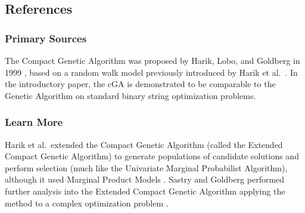

\subsection{References}

% 
% 
\subsubsection{Primary Sources}
The Compact Genetic Algorithm was proposed by Harik, Lobo, and Goldberg in 1999 \cite{Harik1999}, based on a random walk model previously introduced by Harik et al.\ \cite{Harik1997}. In the introductory paper, the cGA is demonstrated to be comparable to the Genetic Algorithm on standard binary string optimization problems.

% 
% 
\subsubsection{Learn More}
Harik et al.\ extended the Compact Genetic Algorithm (called the Extended Compact Genetic Algorithm) to generate populations of candidate solutions and perform selection (much like the Univariate Marginal Probabilist Algorithm), although it used Marginal Product Models \cite{Harik1999a, Harik2006}. Sastry and Goldberg performed further analysis into the Extended Compact Genetic Algorithm applying the method to a complex optimization problem \cite{Sastry2000}.


